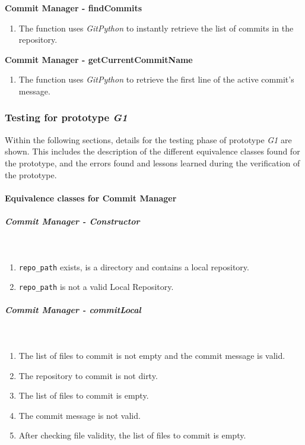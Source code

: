 \textbf{Commit Manager - findCommits}
\begin{enumerate}
    \item The function uses \emph{GitPython} to instantly retrieve the list of commits in the repository.
\end{enumerate}

\textbf{Commit Manager - getCurrentCommitName}
\begin{enumerate}
    \item The function uses \emph{GitPython} to retrieve the first line of the active commit's message.
\end{enumerate}

\subsubsection{Testing for prototype \emph{G1}}

Within the following sections, details for the testing phase of prototype \emph{G1} are shown. This includes the description of the different equivalence classes found for the prototype, and the
errors found and lessons learned during the verification of the prototype.
\newpage
\paragraph{Equivalence classes for Commit Manager}

\subparagraph{Commit Manager - Constructor} \mbox{}\\
\begin{enumerate}
    \item \texttt{repo\_path} exists, is a directory and contains a local repository.
    \item \texttt{repo\_path} is not a valid Local Repository.
\end{enumerate}

\subparagraph{Commit Manager - commitLocal} \mbox{}\\
\begin{enumerate}
    \item The list of files to commit is not empty and the commit message is valid.
    \item The repository to commit is not dirty.
    \item The list of files to commit is empty.
    \item The commit message is not valid.
    \item After checking file validity, the list of files to commit is empty.
\end{enumerate}

